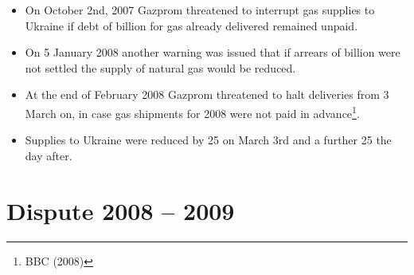 \documentclass[11pt,a4paper,english]{scrreprt}
\begin{document}
\begin{itemize}


\item  On October 2nd, 2007 Gazprom threatened to interrupt gas supplies to
Ukraine if debt of  billion for gas already delivered remained
unpaid.

\item On 5 January 2008 another warning was issued that if arrears of
 billion were not settled the supply of natural gas would be
reduced.

\item At the end of February 2008 Gazprom threatened to halt deliveries from 3 
March on, in case gas shipments for 2008 were not paid in advance\footnote{BBC
(2008)}.

\item Supplies to Ukraine were reduced by 25\textdiscount{} on March 3rd and a
further 25\textdiscount{} the day after.



\end{itemize}


    \section{Dispute 2008 -- 2009}
\end{document}
